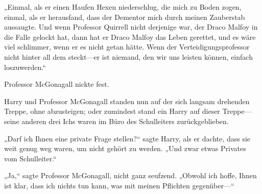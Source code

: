 „Einmal, als er einen Haufen Hexen niederschlug, die mich zu Boden zogen, einmal, als er herausfand, dass der Dementor mich durch meinen Zauberstab aussaugte. Und wenn Professor Quirrell nicht derjenige war, der Draco Malfoy in die Falle gelockt hat, dann hat er Draco Malfoy das Leben gerettet, und es wäre viel schlimmer, wenn er es nicht getan hätte. Wenn der Verteidigungsprofessor nicht hinter all dem steckt—er ist niemand, den wir uns leisten können, einfach loszuwerden.“

Professor McGonagall nickte fest.


Harry und Professor McGonagall standen nun auf der sich langsam drehenden Treppe, ohne abzusteigen; oder zumindest stand ein Harry auf dieser Treppe—seine anderen drei Ichs waren im Büro des Schulleiters zurückgeblieben.

„Darf ich Ihnen eine private Frage stellen?“ sagte Harry, als er dachte, dass sie weit genug weg waren, um nicht gehört zu werden. „Und zwar etwas Privates vom Schulleiter.“

„Ja,“ sagte Professor McGonagall, nicht ganz seufzend. „Obwohl ich hoffe, Ihnen ist klar, dass ich nichts tun kann, was mit meinen Pflichten gegenüber—“

